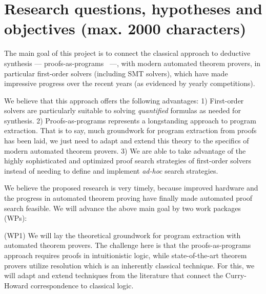 \documentclass[a4paper,12pt]{article}
\begin{document}
\section{Research questions, hypotheses and objectives (max. 2000 characters)}

The main goal of this project is to connect the classical approach to deductive synthesis --- proofs-as-programs~\cite{girard1989proofs} ---, with modern automated theorem provers, in particular first-order solvers (including SMT solvers), which have made impressive progress over the recent years (as evidenced by yearly competitions).

We believe that this approach offers the following advantages:
1) First-order solvers are particularly suitable to solving \emph{quantified} formulas as needed for synthesis.
2) Proofs-as-programs represents a longstanding approach to program extraction.
That is to say, much groundwork for program extraction from proofs has been laid, we just need to adapt and extend this theory to the specifics of modern automated theorem provers.
3) We are able to take advantage of the highly sophisticated and optimized proof search strategies of first-order solvers instead of needing to define and implement \emph{ad-hoc} search strategies.

We believe the proposed research is very timely, because improved hardware and the progress in automated theorem proving have finally made automated proof search feasible.
We will advance the above main goal by two work packages (WPs):

(WP1) We will lay the theoretical groundwork for program extraction with automated theorem provers.
The challenge here is that the proofs-as-programs approach requires proofs in intuitionistic logic, while state-of-the-art theorem provers
utilize resolution which is an inherently classical technique.
For this, we will adapt and extend techniques from the literature that connect the Curry-Howard correspondence to classical logic.
\end{document}
